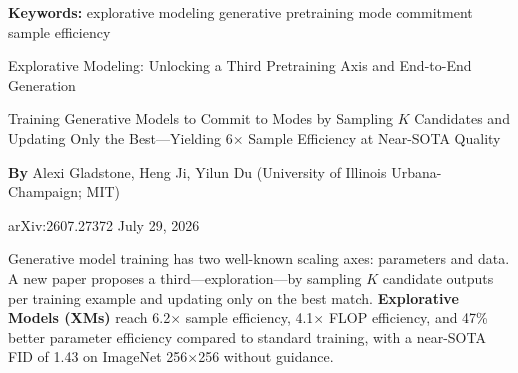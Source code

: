 \documentclass[10pt,twocolumn]{article}
\begin{document}
\setlength{\parindent}{0pt}
\setlength{\parskip}{4pt}

{\small\color{keywordgray}\textbf{Keywords:}
  explorative modeling \textbullet{}
  generative pretraining \textbullet{}
  mode commitment \textbullet{}
  sample efficiency}\par\vspace{4pt}

{\LARGE\bfseries\raggedright
  Explorative Modeling: Unlocking a Third
  Pretraining Axis and End-to-End Generation}\par\vspace{4pt}

{\large\itshape\raggedright
  Training Generative Models to Commit to Modes by Sampling $K$
  Candidates and Updating Only the Best---Yielding 6$\times$ Sample
  Efficiency at Near-SOTA Quality}\par\vspace{6pt}

{\small\textbf{By} Alexi Gladstone, Heng Ji, Yilun Du
  (University of Illinois Urbana-Champaign; MIT)}\par\vspace{2pt}

{\small\color{keywordgray}arXiv:2607.27372 \textbullet{} July 29, 2026}
\par\vspace{2pt}\noindent{\color{rulered}\rule{\columnwidth}{0.6pt}}\vspace{6pt}

Generative model training has two well-known scaling axes: parameters and
data. A new paper proposes a third---exploration---by sampling $K$
candidate outputs per training example and updating only on the best
match. \textbf{Explorative Models (XMs)} reach 6.2$\times$ sample
efficiency, 4.1$\times$ FLOP efficiency, and 47\% better parameter
efficiency compared to standard training, with a near-SOTA FID of 1.43
on ImageNet 256$\times$256 without guidance.
\end{document}
